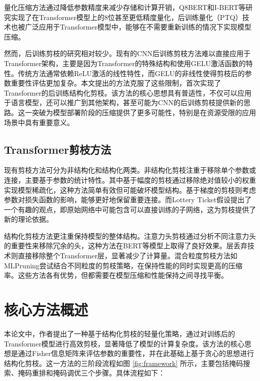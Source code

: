 \documentclass[UTF8,openany]{ctexbook}
\begin{document}
量化压缩方法通过降低参数精度来减少存储和计算开销，Q8BERT\cite{zafrir2019q8bert}和I-BERT\cite{kim2021ibert}等研究实现了在Transformer模型上的8位甚至更低精度量化，后训练量化（PTQ）技术\cite{nagel2020up}也被广泛应用于Transformer模型中，能够在不需要重新训练的情况下实现模型压缩。

然而，后训练剪枝的研究相对较少。现有的CNN后训练剪枝方法\cite{yvinec2021red}难以直接应用于Transformer架构，主要是因为Transformer的特殊结构和使用GELU激活函数\cite{hendrycks2016gaussian}的特性。传统方法通常依赖ReLU激活的线性特性\cite{kim2020neuron}，而GELU的非线性使得剪枝后的参数重要性评估更加复杂。本文提出的方法克服了这些限制，首次实现了Transformer的后训练结构化剪枝。该方法的核心思想具有普适性，不仅可以应用于语言模型，还可以推广到其他架构，甚至可能为CNN的后训练剪枝提供新的思路。这一突破为模型部署阶段的压缩提供了更多可能性，特别是在资源受限的应用场景中具有重要意义。

\subsection{Transformer剪枝方法}
\label{sec:transformer_pruning_methods}

现有剪枝方法可分为非结构化和结构化两类。非结构化剪枝注重于移除单个参数或连接，主要基于参数的统计特性。其中基于幅度的剪枝\cite{gale2019state}通过移除绝对值较小的权重实现模型稀疏化，这种方法简单有效但可能破坏模型结构。基于梯度的剪枝\cite{molchanov2019importance}则考虑参数对损失函数的影响，能够更好地保留重要连接。而Lottery Ticket假设\cite{frankle2018lottery}提出了一个有趣的观点，即原始网络中可能包含可以直接训练的子网络，这为剪枝提供了新的理论依据。

结构化剪枝方法更注重保持模型的整体结构。注意力头剪枝\cite{michel2019heads}通过分析不同注意力头的重要性来移除冗余的头，这种方法在BERT等模型上取得了良好效果。层丢弃技术\cite{fan2019reducing}则直接移除整个Transformer层，显著减少了计算量。混合粒度剪枝方法如MLPruning\cite{yao2021mlpruning}尝试结合不同粒度的剪枝策略，在保持性能的同时实现更高的压缩率。这些方法各有优势，但都需要在模型压缩和性能保持之间寻找平衡。

\section{核心方法概述}

本论文中，作者提出了一种基于结构化剪枝的轻量化策略，通过对训练后的Transformer模型进行高效剪枝，显著降低了模型的计算复杂度。该方法的核心思想是通过Fisher信息矩阵来评估参数的重要性，并在此基础上基于贪心的思想进行结构化剪枝。这一方法的三阶段流程如图 \ref{fig:framework} 所示，主要包括掩码搜索、掩码重排和掩码调优三个步骤。具体流程如下：
\end{document}
